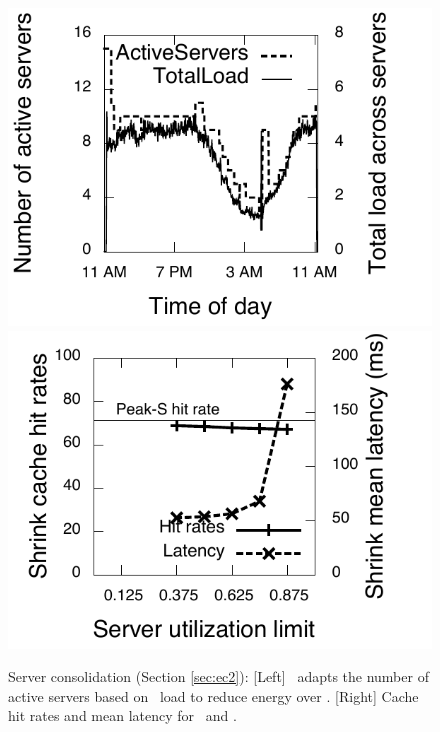 \begin{figure}
\centering
\includegraphics[scale=0.4]{graphs/final/num-servers.pdf}
\includegraphics[scale=0.4]{graphs/final/hit-rate.pdf}
\caption{Server consolidation (Section \ref{sec:ec2}): [Left] \shrink\ adapts the number of active servers based on \cdc\  load to reduce energy over \peakS. [Right] Cache hit rates and mean latency for \shrink\ and \peakS.}
\label{fig:ec2-other}
\end{figure}

